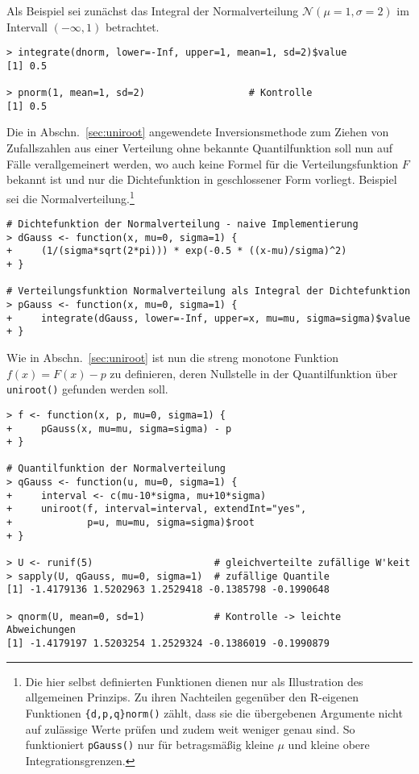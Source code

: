Als Beispiel sei zunächst das Integral der Normalverteilung $\mathcal{N}(\mu=1, \sigma=2)$ im Intervall $(-\infty, 1)$ betrachtet.
\begin{lstlisting}
> integrate(dnorm, lower=-Inf, upper=1, mean=1, sd=2)$value
[1] 0.5

> pnorm(1, mean=1, sd=2)                  # Kontrolle
[1] 0.5
\end{lstlisting}

Die in Abschn.\ \ref{sec:uniroot} angewendete Inversionsmethode zum Ziehen von Zufallszahlen aus einer Verteilung ohne bekannte Quantilfunktion soll nun auf Fälle verallgemeinert werden, wo auch keine Formel für die Verteilungsfunktion $F$ bekannt ist und nur die Dichtefunktion in geschlossener Form vorliegt. Beispiel sei die Normalverteilung.\footnote{Die hier selbst definierten Funktionen dienen nur als Illustration des allgemeinen Prinzips. Zu ihren Nachteilen gegenüber den R-eigenen Funktionen \texttt{\{d,p,q\}norm()} zählt, dass sie die übergebenen Argumente nicht auf zulässige Werte prüfen und zudem weit weniger genau sind. So funktioniert \lstinline!pGauss()! nur für betragsmäßig kleine $\mu$ und kleine obere Integrationsgrenzen.}
\begin{lstlisting}
# Dichtefunktion der Normalverteilung - naive Implementierung
> dGauss <- function(x, mu=0, sigma=1) {
+     (1/(sigma*sqrt(2*pi))) * exp(-0.5 * ((x-mu)/sigma)^2)
+ }

# Verteilungsfunktion Normalverteilung als Integral der Dichtefunktion
> pGauss <- function(x, mu=0, sigma=1) {
+     integrate(dGauss, lower=-Inf, upper=x, mu=mu, sigma=sigma)$value
+ }
\end{lstlisting}

Wie in Abschn.\ \ref{sec:uniroot} ist nun die streng monotone Funktion $f(x) = F(x) - p$ zu definieren, deren Nullstelle in der Quantilfunktion über \lstinline!uniroot()! gefunden werden soll.
\begin{lstlisting}
> f <- function(x, p, mu=0, sigma=1) {
+     pGauss(x, mu=mu, sigma=sigma) - p
+ }

# Quantilfunktion der Normalverteilung  
> qGauss <- function(u, mu=0, sigma=1) {
+     interval <- c(mu-10*sigma, mu+10*sigma)
+     uniroot(f, interval=interval, extendInt="yes",
+             p=u, mu=mu, sigma=sigma)$root
+ }

> U <- runif(5)                     # gleichverteilte zufällige W'keit
> sapply(U, qGauss, mu=0, sigma=1)  # zufällige Quantile
[1] -1.4179136 1.5202963 1.2529418 -0.1385798 -0.1990648

> qnorm(U, mean=0, sd=1)            # Kontrolle -> leichte Abweichungen
[1] -1.4179197 1.5203254 1.2529324 -0.1386019 -0.1990879
\end{lstlisting}

